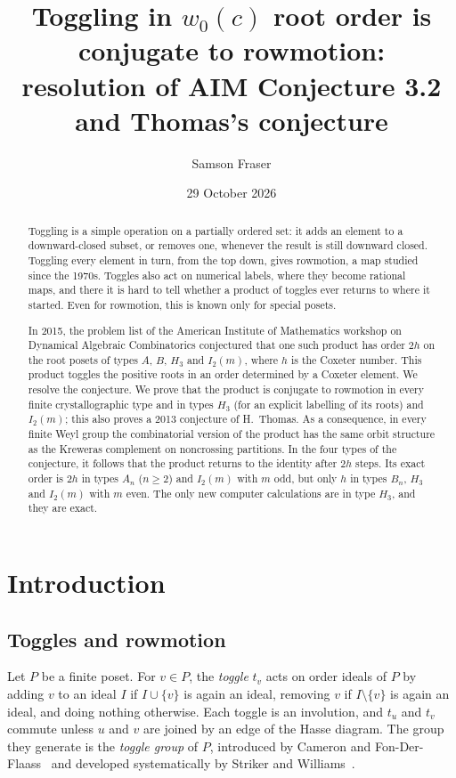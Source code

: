 \documentclass[11pt]{amsart}
\title[Toggling in $w_0(c)$ root order]{Toggling in \texorpdfstring{$w_0(c)$}{w0(c)} root order is conjugate to rowmotion:\\ resolution of AIM Conjecture 3.2 and Thomas's conjecture}
\author{Samson Fraser}
\date{29 October 2026}
\theoremstyle{definition}
\begin{document}
\begin{abstract}
Toggling is a simple operation on a partially ordered set: it adds an element to a downward-closed subset, or removes one, whenever the result is still downward closed. Toggling every element in turn, from the top down, gives rowmotion, a map studied since the 1970s. Toggles also act on numerical labels, where they become rational maps, and there it is hard to tell whether a product of toggles ever returns to where it started. Even for rowmotion, this is known only for special posets.

In 2015, the problem list of the American Institute of Mathematics workshop on Dynamical Algebraic Combinatorics conjectured that one such product has order $2h$ on the root posets of types $A$, $B$, $H_3$ and $I_2(m)$, where $h$ is the Coxeter number. This product toggles the positive roots in an order determined by a Coxeter element. We resolve the conjecture. We prove that the product is conjugate to rowmotion in every finite crystallographic type and in types $H_3$ (for an explicit labelling of its roots) and $I_2(m)$; this also proves a 2013 conjecture of H.~Thomas. As a consequence, in every finite Weyl group the combinatorial version of the product has the same orbit structure as the Kreweras complement on noncrossing partitions. In the four types of the conjecture, it follows that the product returns to the identity after $2h$ steps. Its exact order is $2h$ in types $A_n$ ($n\ge2$) and $I_2(m)$ with $m$ odd, but only $h$ in types $B_n$, $H_3$ and $I_2(m)$ with $m$ even. The only new computer calculations are in type $H_3$, and they are exact.
\end{abstract}
\maketitle

\section{Introduction}

\subsection{Toggles and rowmotion}
Let $P$ be a finite poset. For $v\in P$, the \emph{toggle} $t_v$ acts on order ideals of $P$ by adding $v$ to an ideal $I$ if $I\cup\{v\}$ is again an ideal, removing $v$ if $I\setminus\{v\}$ is again an ideal, and doing nothing otherwise. Each toggle is an involution, and $t_u$ and $t_v$ commute unless $u$ and $v$ are joined by an edge of the Hasse diagram. The group they generate is the \emph{toggle group} of $P$, introduced by Cameron and Fon-Der-Flaass~\cite{CFF} and developed systematically by Striker and Williams~\cite{SW}.
\end{document}
